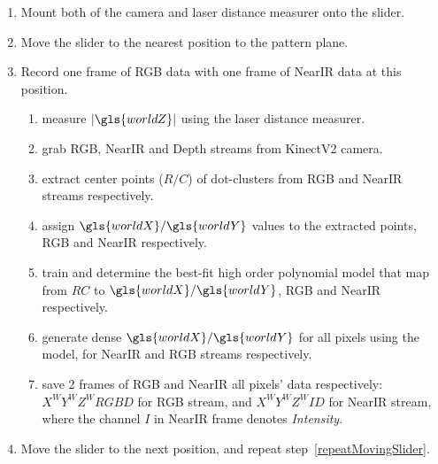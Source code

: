 \begin{enumerate}
   	\item Mount both of the camera and laser distance measurer onto the slider.
   	\item Move the slider to the nearest position to the pattern plane.
   	\item Record one frame of RGB data with one frame of \gls{NearIR} data at this position.
   	\label{repeatMovingSlider}
   	\begin{enumerate}
     		\item measure \(|\gls{worldZ}|\) using the laser distance measurer.
     		\item grab RGB, \gls{NearIR} and Depth streams from \gls{KinectV2} camera.
     		\item extract center points (\(R/C\)) of dot-clusters from RGB and \gls{NearIR} streams respectively.
     		\item assign \(\gls{worldX}/\gls{worldY}\) values to the extracted points, RGB and \gls{NearIR} respectively.
     		\item train and determine the best-fit high order polynomial model that map from \(RC\) to \(\gls{worldX}/\gls{worldY}\), RGB and \gls{NearIR} respectively.
     		\item generate dense \(\gls{worldX}/\gls{worldY}\) for all pixels using the model, for \gls{NearIR} and RGB streams respectively.
     		\item save 2 frames of RGB and \gls{NearIR} all pixels' data respectively: \(X^WY^WZ^WRGBD\) for RGB stream, and \(X^WY^WZ^WID\) for \gls{NearIR} stream, where the channel \(I\) in \gls{NearIR} frame denotes \emph{Intensity}.
   	\end{enumerate}
	\item Move the slider to the next position, and repeat step~\ref{repeatMovingSlider}.
\end{enumerate}
